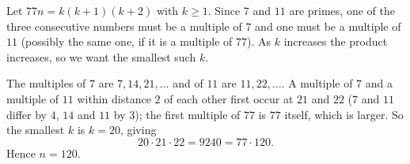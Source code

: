 Let $77n=k(k+1)(k+2)$ with $k\ge1$. Since $7$ and $11$ are primes, one of the three consecutive numbers must be a multiple of $7$ and one must be a multiple of $11$ (possibly the same one, if it is a multiple of $77$). As $k$ increases the product increases, so we want the smallest such $k$.

The multiples of $7$ are $7,14,21,\dots$ and of $11$ are $11,22,\dots$. A multiple of $7$ and a multiple of $11$ within distance $2$ of each other first occur at $21$ and $22$ ($7$ and $11$ differ by $4$, $14$ and $11$ by $3$); the first multiple of $77$ is $77$ itself, which is larger. So the smallest $k$ is $k=20$, giving
\[
20\cdot21\cdot22=9240=77\cdot120 .
\]
Hence $n=\boxed{120}$.
